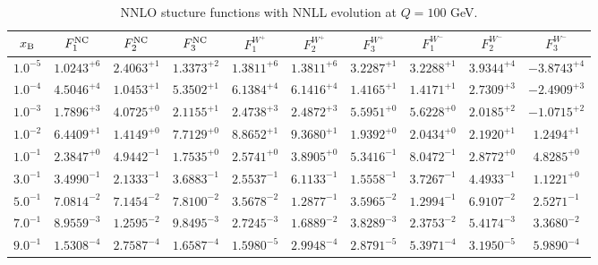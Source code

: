 \begin{table}[h]
\begin{adjustbox}{width=\textwidth}
\begin{tabular}{|c||c|c|c|c|c|c|c|c|c|}
\hline
$x_{\rm B}$ & $F_1^{\rm NC}$ & $F_2^{\rm NC}$ & $F_3^{\rm NC}$ & $F_1^{W^+}$ & $F_2^{W^+}$ & $F_3^{W^+}$ & $F_1^{W^-}$ & $F_2^{W^-}$ & $F_3^{W^-}$ \\
\hline
$ 1.0^{-5}$ & $ 1.0243^{+6}$ & $ 2.4063^{+1}$ & $ 1.3373^{+2}$ & $ 1.3811^{+6}$ & $ 1.3811^{+6}$ & $ 3.2287^{+1}$ & $ 3.2288^{+1}$ & $ 3.9344^{+4}$ & $-3.8743^{+4}$ \\
$ 1.0^{-4}$ & $ 4.5046^{+4}$ & $ 1.0453^{+1}$ & $ 5.3502^{+1}$ & $ 6.1384^{+4}$ & $ 6.1416^{+4}$ & $ 1.4165^{+1}$ & $ 1.4171^{+1}$ & $ 2.7309^{+3}$ & $-2.4909^{+3}$ \\
$ 1.0^{-3}$ & $ 1.7896^{+3}$ & $ 4.0725^{+0}$ & $ 2.1155^{+1}$ & $ 2.4738^{+3}$ & $ 2.4872^{+3}$ & $ 5.5951^{+0}$ & $ 5.6228^{+0}$ & $ 2.0185^{+2}$ & $-1.0715^{+2}$ \\
$ 1.0^{-2}$ & $ 6.4409^{+1}$ & $ 1.4149^{+0}$ & $ 7.7129^{+0}$ & $ 8.8652^{+1}$ & $ 9.3680^{+1}$ & $ 1.9392^{+0}$ & $ 2.0434^{+0}$ & $ 2.1920^{+1}$ & $ 1.2494^{+1}$ \\
$ 1.0^{-1}$ & $ 2.3847^{+0}$ & $ 4.9442^{-1}$ & $ 1.7535^{+0}$ & $ 2.5741^{+0}$ & $ 3.8905^{+0}$ & $ 5.3416^{-1}$ & $ 8.0472^{-1}$ & $ 2.8772^{+0}$ & $ 4.8285^{+0}$ \\
$ 3.0^{-1}$ & $ 3.4990^{-1}$ & $ 2.1333^{-1}$ & $ 3.6883^{-1}$ & $ 2.5537^{-1}$ & $ 6.1133^{-1}$ & $ 1.5558^{-1}$ & $ 3.7267^{-1}$ & $ 4.4933^{-1}$ & $ 1.1221^{+0}$ \\
$ 5.0^{-1}$ & $ 7.0814^{-2}$ & $ 7.1454^{-2}$ & $ 7.8100^{-2}$ & $ 3.5678^{-2}$ & $ 1.2877^{-1}$ & $ 3.5965^{-2}$ & $ 1.2994^{-1}$ & $ 6.9107^{-2}$ & $ 2.5271^{-1}$ \\
$ 7.0^{-1}$ & $ 8.9559^{-3}$ & $ 1.2595^{-2}$ & $ 9.8495^{-3}$ & $ 2.7245^{-3}$ & $ 1.6889^{-2}$ & $ 3.8289^{-3}$ & $ 2.3753^{-2}$ & $ 5.4174^{-3}$ & $ 3.3680^{-2}$ \\
$ 9.0^{-1}$ & $ 1.5308^{-4}$ & $ 2.7587^{-4}$ & $ 1.6587^{-4}$ & $ 1.5980^{-5}$ & $ 2.9948^{-4}$ & $ 2.8791^{-5}$ & $ 5.3971^{-4}$ & $ 3.1950^{-5}$ & $ 5.9890^{-4}$ \\
\hline
\end{tabular}
\end{adjustbox}\caption{NNLO stucture functions with NNLL evolution at $Q = 100$ GeV.}
\label{tab:N2LO-Q100}
\end{table}


